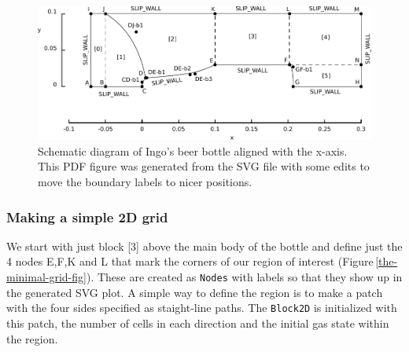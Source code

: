 \begin{figure}[htbp]
\begin{center}
\includegraphics[width=\textwidth]{../2D/beer-bottle/the_clustered_bottle_edited.pdf}
\end{center}
\caption{Schematic diagram of Ingo's beer bottle aligned with the x-axis.
	 This PDF figure was generated from the SVG file with some edits 
	 to move the boundary labels to nicer positions.}
\label{the-clustered-bottle-svg-fig}
\end{figure}

\subsubsection*{Making a simple 2D grid}
%
We start with just block [3] above the main body of the bottle
and define just the 4 nodes E,F,K and L that mark the corners of our
region of interest (Figure\,\ref{the-minimal-grid-fig}).
These are created as \texttt{Nodes} with labels so that they show up in
the generated SVG plot.
A simple way to define the region is to make a patch with the four sides
specified as staight-line paths.
The \texttt{Block2D} is initialized with this patch, the number of cells
in each direction and the initial gas state within the region.

\noindent
\topbar

\bottombar

